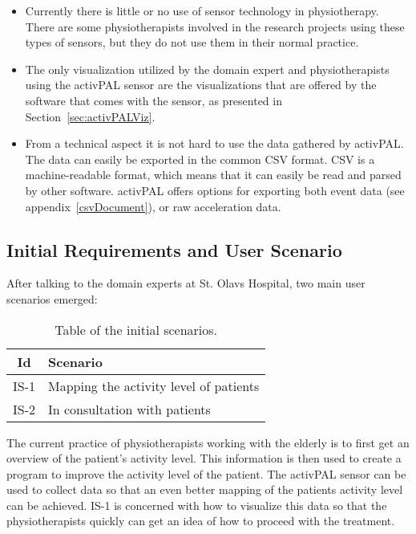\begin{itemize}
\item Currently there is little or no use of sensor technology in physiotherapy. There are some physiotherapists involved in the research projects using these types of sensors, but they do not use them in their normal practice. 

\item The only visualization utilized by the domain expert and physiotherapists using the activPAL sensor are the visualizations that are offered by the software that comes with the sensor, as presented in Section~\ref{sec:activPALViz}.

\item From a technical aspect it is not hard to use the data gathered by activPAL. The data can easily be exported in the common CSV format. CSV is a machine-readable format, which means that it can easily be read and parsed by other software. activPAL offers options for exporting both event data (see appendix~\ref{csvDocument}), or raw acceleration data.

\end{itemize}

\subsection{Initial Requirements and User Scenario}
After talking to the domain experts at St. Olavs Hospital, two main user scenarios emerged:

\begin{table}[!h]
  \centering
  \begin{tabular}{|c|l|}
    \hline
    \textbf{Id} & \textbf{Scenario} \\ \hline
    IS-1 & Mapping the activity level of patients \\ \hline
    IS-2 & In consultation with patients \\ \hline
  \end{tabular}
  \caption{Table of the initial scenarios.}
\end{table}

The current practice of physiotherapists working with the elderly is to first get an overview of the patient's activity level. This information is then used to create a program to improve the activity level of the patient. The activPAL sensor can be used to collect data so that an even better mapping of the patients activity level can be achieved. IS-1 is concerned with how to visualize this data so that the physiotherapists quickly can get an idea of how to proceed with the treatment.

